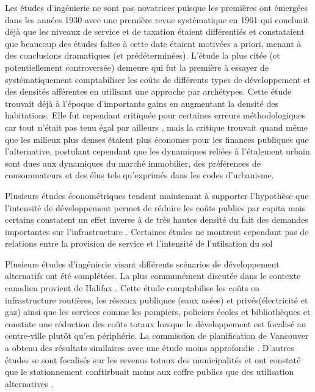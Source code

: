     Les études d'ingénierie ne sont pas novatrices puisque les premières ont émergées dans les années 1930 \parencite{city_planning_board_report_1934} avec une première revue systématique en 1961 \parencite{mace_municipal_1961} qui concluait déjà que les niveaux de service et de taxation étaient différentiés et constataient que beaucoup des études faites à cette date étaient motivées a priori, menant à des conclusions dramatiques (et prédéterminées). L'étude la plus citée (et potentiellement controversée) demeure \textcite{real_estate_research_corporation_costs_1974,real_estate_research_corporation_costs_1974-1} qui fut la première à essayer de systématiquement comptabiliser les coûts de différents types de développement et des densités afférentes en utilisant une approche par archétypes. Cette étude trouvait déjà à l'époque d'importants gains en augmentant la densité des habitations. Elle fut cependant critiquée pour certaines erreurs méthodologiques car tout n'était pas tenu égal par ailleurs \parencite{windsor_critique_1979}, mais la critique trouvait quand même que les milieux plus denses étaient plus économes pour les finances publiques que l'alternative, postulant cependant que les dynamiques reliées à l'étalement urbain sont dues aux dynamiques du marché immobilier, des préférences de consommateurs et des élus tels qu'exprimés dans les codes d'urbanisme. \par
    Plusieurs études économétriques tendent maintenant à supporter l'hypothèse que l'intensité de développement permet de réduire les coûts publics par capita \parencite{hortas-rico_does_2010,raghav_literature_2019} mais certains constatent un effet inverse à de très hautes densité du fait des demandes importantes sur l'infrastructure \parencite{goodman_fiscal_2019,ladd_population_1992,garrido-jimenez_municipal_2018}. Certaines études ne montrent cependant pas de relations entre la provision de service et l'intensité de l'utilsation du sol \parencite{holcombe_impact_2008,}\par
    Plusieurs études d'ingénierie visant différents scénarios de développement alternatifs ont été complétées. La plus communément discutée dans le contexte canadien provient de Halifax \parencite{stantec_consulting_ltd_quantifying_2013}. Cette étude comptabilise les coûts en infrastructure routières, les réseaux publiques (eaux usées) et privés(électricité et gaz) ainsi que les services comme les pompiers, policiers écoles et bibliothèques et constate une réduction des coûts totaux lorsque le développement est focalisé au centre-ville plutôt qu'en périphérie. La commission de planification de Vancouver a obtenu des résultats similaires avec une étude moins approfondie \parencite{metro_vancouver_regional_planning_cost_2023}. D'autres études se sont focalisés sur les revenus totaux des municipalités et ont constaté que le stationnement conftirbuait moins aux coffre publics que des utilisation alternatives \parencite{blanc_effects_2014}. \par
